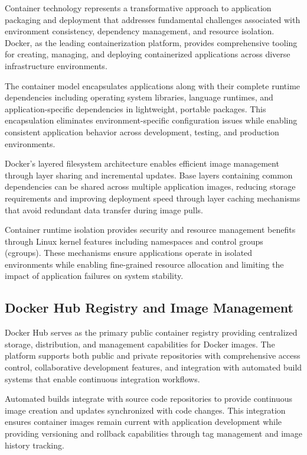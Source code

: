 Container technology represents a transformative approach to application packaging and deployment that addresses fundamental challenges associated with environment consistency, dependency management, and resource isolation. Docker, as the leading containerization platform, provides comprehensive tooling for creating, managing, and deploying containerized applications across diverse infrastructure environments.

The container model encapsulates applications along with their complete runtime dependencies including operating system libraries, language runtimes, and application-specific dependencies in lightweight, portable packages. This encapsulation eliminates environment-specific configuration issues while enabling consistent application behavior across development, testing, and production environments.

Docker's layered filesystem architecture enables efficient image management through layer sharing and incremental updates. Base layers containing common dependencies can be shared across multiple application images, reducing storage requirements and improving deployment speed through layer caching mechanisms that avoid redundant data transfer during image pulls.

Container runtime isolation provides security and resource management benefits through Linux kernel features including namespaces and control groups (cgroups). These mechanisms ensure applications operate in isolated environments while enabling fine-grained resource allocation and limiting the impact of application failures on system stability.

\subsection{Docker Hub Registry and Image Management}

Docker Hub serves as the primary public container registry providing centralized storage, distribution, and management capabilities for Docker images. The platform supports both public and private repositories with comprehensive access control, collaborative development features, and integration with automated build systems that enable continuous integration workflows.

Automated builds integrate with source code repositories to provide continuous image creation and updates synchronized with code changes. This integration ensures container images remain current with application development while providing versioning and rollback capabilities through tag management and image history tracking.

